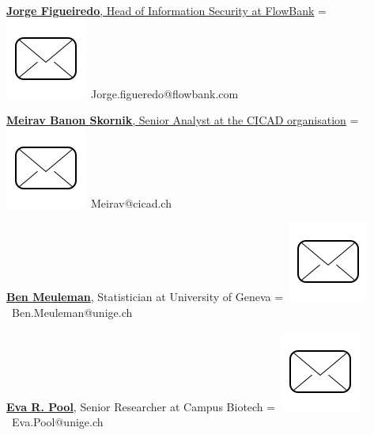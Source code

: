\documentclass[]{plushcv}
\begin{document}
\begin{minipage}[t]{0.70\textwidth}
\href{https://genev.unige.ch/research/people/Jose-Manuel-De-Abreu-Nunes}{\textbf{Jorge Figueiredo},  Head of Information Security at FlowBank}
\begingroup
{}=\hbox{
\includegraphics[scale=0.1,trim={0 1cm 0cm 0cm}]{icons/main/mail.png}\hspace{0.1cm} Jorge.figueredo@flowbank.com
}
\parbox{\wd0}{}\endgroup
\sectionsep

\href{https://genev.unige.ch/research/people/Jose-Manuel-De-Abreu-Nunes}{\textbf{Meirav Banon Skornik}, Senior Analyst at the CICAD organisation}
\begingroup
{}=\hbox{
\includegraphics[scale=0.1,trim={0 1cm 0cm 0cm}]{icons/main/mail.png}\hspace{0.1cm} Meirav@cicad.ch
}
\parbox{\wd0}{}\endgroup
\sectionsep

\sectionsep
\href{https://www.unige.ch/cisa/center/members/meuleman-ben/}{\textbf{Ben Meuleman}}, Statistician at University of Geneva
\begingroup
{}=\hbox{
\includegraphics[scale=0.1,trim={0 1cm 0cm 0cm}]{icons/main/mail.png}\hspace{0.1cm} Ben.Meuleman@unige.ch
}
\parbox{\wd0}{}\endgroup
\sectionsep



\sectionsep
\href{https://www.researchgate.net/profile/Eva-Pool}{\textbf{Eva R. Pool}}, Senior Researcher at Campus Biotech 
\begingroup
{}=\hbox{
\includegraphics[scale=0.1,trim={0 1cm 0cm 0cm}]{icons/main/mail.png}\hspace{0.1cm} Eva.Pool@unige.ch
}
\parbox{\wd0}{}\endgroup
\sectionsep


\end{minipage}
\end{document}

